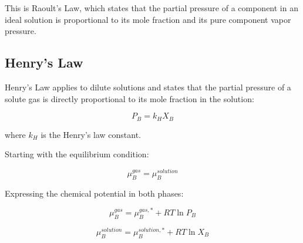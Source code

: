 \documentclass{article}
\theoremstyle{definition}
\begin{document}
This is Raoult’s Law, which states that the partial pressure of a component in an ideal solution is proportional to its mole fraction and its pure component vapor pressure.

\begin{center}
\end{center}

\subsection{Henry's Law}

Henry's Law applies to dilute solutions and states that the partial pressure of a solute gas is directly proportional to its mole fraction in the solution:

\begin{equation}
P_B = k_H X_B
\end{equation}

where $k_H$ is the Henry’s law constant.

Starting with the equilibrium condition:

\begin{equation}
\mu_B^{gas} = \mu_B^{solution}
\end{equation}

Expressing the chemical potential in both phases:

\begin{equation}
\mu_B^{gas} = \mu_B^{gas,*} + RT \ln P_B
\end{equation}

\begin{equation}
\mu_B^{solution} = \mu_B^{solution,*} + RT \ln X_B
\end{equation}
\end{document}
